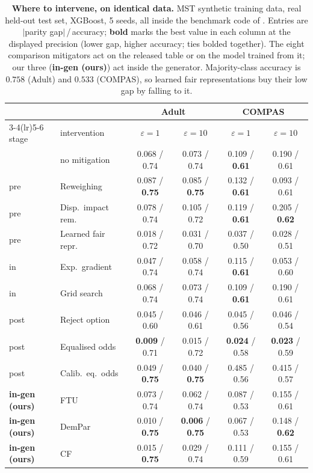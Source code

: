 \begin{table}[t]
\centering\footnotesize
\caption{\textbf{Where to intervene, on identical data.} MST synthetic
training data, real held-out test set, XGBoost, 5 seeds, all inside the
benchmark code of \citet{angelozzi2026where}. Entries are $|$parity
gap$|$\,/\,accuracy; \textbf{bold} marks the best value in each column at
the displayed precision (lower gap, higher accuracy; ties bolded together).
The eight comparison mitigators act on the released table or on the model
trained from it; our three (\textbf{in-gen (ours)}) act inside the
generator. Majority-class accuracy is $0.758$ (Adult) and $0.533$ (COMPAS),
so learned fair representations buy their low gap by falling to it.}
\label{tab:baselines}
\begin{tabular}{llcccc}
\toprule
 & & \multicolumn{2}{c}{Adult} & \multicolumn{2}{c}{COMPAS} \\
\cmidrule(lr){3-4}\cmidrule(lr){5-6}
stage & intervention & $\varepsilon{=}1$ & $\varepsilon{=}10$ & $\varepsilon{=}1$ & $\varepsilon{=}10$ \\
\midrule
 & no mitigation        & 0.068 / 0.74 & 0.073 / 0.74 & 0.109 / \textbf{0.61} & 0.190 / 0.61 \\
\addlinespace[2pt]
pre  & Reweighing         & 0.087 / \textbf{0.75} & 0.085 / \textbf{0.75} & 0.132 / \textbf{0.61} & 0.093 / 0.61 \\
pre  & Disp.\ impact rem. & 0.078 / 0.74 & 0.105 / 0.72 & 0.119 / \textbf{0.61} & 0.205 / \textbf{0.62} \\
pre  & Learned fair repr. & 0.018 / 0.72 & 0.031 / 0.70 & 0.037 / 0.50 & 0.028 / 0.51 \\
\addlinespace[2pt]
in   & Exp.\ gradient     & 0.047 / 0.74 & 0.058 / 0.74 & 0.115 / \textbf{0.61} & 0.053 / 0.60 \\
in   & Grid search        & 0.068 / 0.74 & 0.073 / 0.74 & 0.109 / \textbf{0.61} & 0.190 / 0.61 \\
\addlinespace[2pt]
post & Reject option      & 0.045 / 0.60 & 0.046 / 0.61 & 0.045 / 0.56 & 0.046 / 0.54 \\
post & Equalised odds     & \textbf{0.009} / 0.71 & 0.015 / 0.72 & \textbf{0.024} / 0.58 & \textbf{0.023} / 0.59 \\
post & Calib.\ eq.\ odds  & 0.049 / \textbf{0.75} & 0.040 / \textbf{0.75} & 0.485 / 0.56 & 0.415 / 0.57 \\
\addlinespace[2pt]
\textbf{in-gen (ours)} & FTU    & 0.073 / 0.74 & 0.062 / 0.74 & 0.087 / 0.53 & 0.155 / 0.61 \\
\textbf{in-gen (ours)} & DemPar & 0.010 / \textbf{0.75} & \textbf{0.006} / \textbf{0.75} & 0.067 / 0.53 & 0.148 / \textbf{0.62} \\
\textbf{in-gen (ours)} & CF     & 0.015 / \textbf{0.75} & 0.029 / 0.74 & 0.111 / 0.59 & 0.155 / 0.61 \\
\bottomrule
\end{tabular}
\end{table}
